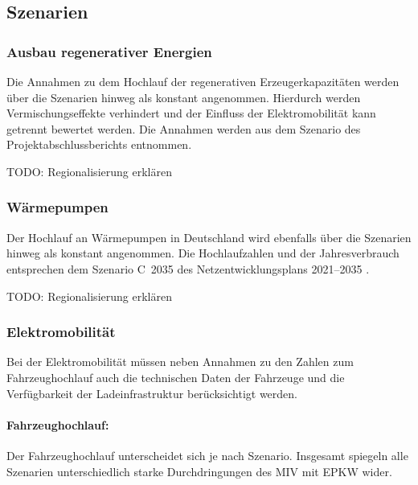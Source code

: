 \subsection{Szenarien}

\subsubsection{Ausbau regenerativer Energien}

Die Annahmen zu dem Hochlauf der regenerativen Erzeugerkapazitäten werden über die Szenarien hinweg als konstant angenommen.
Hierdurch werden Vermischungseffekte verhindert und der Einfluss der Elektromobilität kann getrennt bewertet werden.
Die Annahmen werden aus dem Szenario \ego des \openego Projektabschlussberichts \cite{Mueller2019} entnommen.



{\color{red} TODO: Regionalisierung erklären}

\subsubsection{Wärmepumpen}

Der Hochlauf an Wärmepumpen in Deutschland wird ebenfalls über die Szenarien hinweg als konstant angenommen.
Die Hochlaufzahlen und der Jahresverbrauch entsprechen dem Szenario C~\num{2035} des Netzentwicklungsplans \numrange[range-phrase=~{--}~]{2021}{2035} \cite{BNetzA2020}.



{\color{red} TODO: Regionalisierung erklären}

\subsubsection{Elektromobilität}\label{chap:EMob_Szenarien}

Bei der Elektromobilität müssen neben Annahmen zu den Zahlen zum Fahrzeughochlauf auch die technischen Daten der Fahrzeuge und die Verfügbarkeit der Ladeinfrastruktur berücksichtigt werden.

\paragraph{Fahrzeughochlauf:}
Der Fahrzeughochlauf unterscheidet sich je nach Szenario.
Insgesamt spiegeln alle Szenarien unterschiedlich starke Durchdringungen des \gls{MIV} mit \gls{EPKW} wider.\medskip

